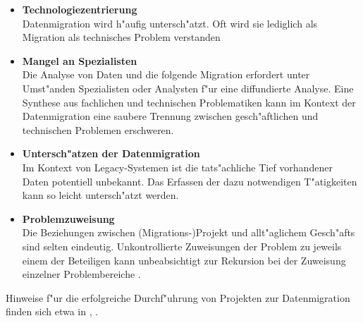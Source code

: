 \begin{itemize}
	\item \textbf{Technologiezentrierung} \\
			Datenmigration wird h"aufig untersch"atzt. Oft wird sie lediglich als Migration als technisches Problem verstanden \citep[S.~9]{morris-2012}
	\item \textbf{Mangel an Spezialisten} \\
			Die Analyse von Daten und die folgende Migration erfordert unter Umst"anden Spezialisten oder Analysten f"ur eine diffundierte Analyse. Eine Synthese aus fachlichen und technischen Problematiken kann im Kontext der Datenmigration eine saubere Trennung zwischen gesch"aftlichen und technischen Problemen erschweren.
	\item \textbf{Untersch"atzen der Datenmigration} \\
			Im Kontext von Legacy-Systemen ist die tats"achliche Tief vorhandener Daten potentiell unbekannt. Das Erfassen der dazu notwendigen T"atigkeiten kann so leicht untersch"atzt werden.
	\item \textbf{Problemzuweisung} \\
			Die Beziehungen zwischen (Migrations-)Projekt und allt"aglichem Gesch"afts sind selten eindeutig. Unkontrollierte Zuweisungen der Problem zu jeweils einem der Beteiligen kann unbeabsichtigt zur Rekursion bei der Zuweisung einzelner Problembereiche \citep[S.~9]{morris-2012}.
\end{itemize}

Hinweise f"ur die erfolgreiche Durchf"uhrung von Projekten zur Datenmigration finden sich etwa in \citep{sas-2009}, \citep{oracle-2011}. %
